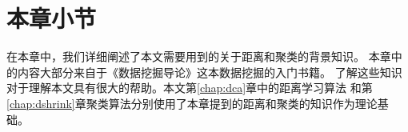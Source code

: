 \section{本章小节}

在本章中，我们详细阐述了本文需要用到的关于距离和聚类的背景知识。
本章中的内容大部分来自于《数据挖掘导论》这本数据挖掘的入门书籍。
了解这些知识对于理解本文具有很大的帮助。本文第\ref{chap:dca}章中的距离学习算法
和第\ref{chap:dshrink}章聚类算法分别使用了本章提到的距离和聚类的知识作为理论基础。
